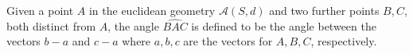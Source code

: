 Given a point $A$ in the euclidean geometry $\mathcal{A}(S, d)$ and two further points $B, C$, both distinct from $A$, the angle $\widehat{BAC}$ is defined to be the angle between the vectors $b - a$ and $c - a$ where $a, b, c$ are the vectors for $A, B, C$, respectively.
